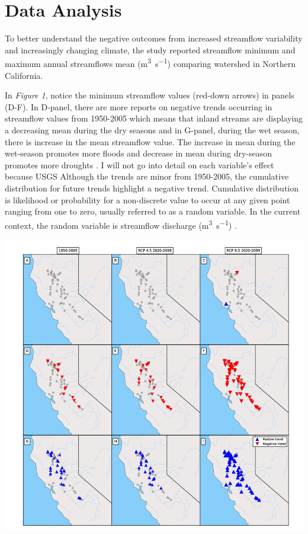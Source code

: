 \documentclass[a4paper,man,biblatex]{apa7}
\begin{document}
\section{Data Analysis}  
\par To better understand the negative outcomes from increased streamflow variability and increasingly changing climate, the \textcite{mallakpour_2018} study reported streamflow minimum and maximum annual streamflows mean (\si{\cubic\meter\per\second}) comparing watershed in Northern California.\\ 
\par In \textit{Figure 1}, notice the minimum streamflow values (red-down arrows) in panels (D-F). In D-panel, there are more reports on negative trends occurring in streamflow values from 1950-2005 which means that inland streams are displaying a decreasing mean during the dry seasons and in G-panel, during the wet season, there is increase in the mean streamflow value. The increase in mean during the wet-season promotes more floods and decrease in mean during dry-season promotes more droughts \autocite{mallakpour_2018}. I will not go into detail on each variable's effect because USGS Although the trends are minor from 1950-2005, the cumulative distribution for future trends highlight a negative trend. Cumulative distribution is likelihood or probability for a non-discrete value to occur at any given point ranging from one to zero, usually referred to as a random variable. In the current context, the random variable is streamflow discharge (\si{\cubic\meter\per\second}) \autocite{cdf_def}.\\
 \begin{minipage}{0.65\linewidth}   
     \includegraphics[scale=0.35]{stream_flow_cali.png}
     \label{fig:streamflow_trend}
\end{minipage}
\end{document}
